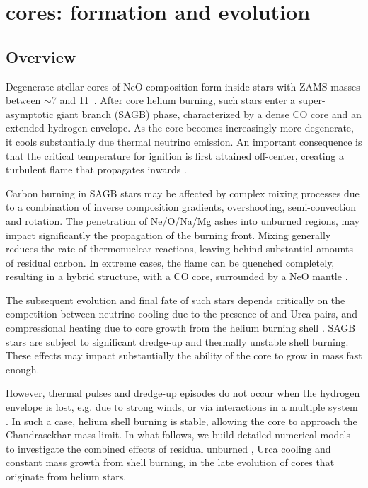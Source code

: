 \documentclass[twocolumn]{aa}
\begin{document}
\section{\one cores: formation and evolution}\label{sec:2}
\subsection{Overview}
Degenerate stellar cores of NeO composition form inside stars with ZAMS masses  
between  $\sim$7 and 11\msun\ \citep[e.g.][]{Poelarends:2007ip,Farmer:2015afs}. 
After core helium burning, such stars enter a super-asymptotic giant branch 
(SAGB) phase, characterized by a dense CO  
core and an  extended hydrogen envelope.  
As the core becomes increasingly more degenerate, it cools substantially 
due thermal neutrino emission. An important consequence is that the critical 
temperature for  ignition is first attained off-center, creating a 
turbulent flame that propagates inwards \citep{siess2006}. 
 

Carbon burning in SAGB stars may be affected by complex mixing processes 
due to a combination of inverse composition gradients, overshooting, 
semi-convection and rotation. The penetration of 
Ne/O/Na/Mg ashes into unburned regions, may impact significantly the propagation of
the burning front. Mixing generally reduces the rate of thermonuclear reactions, leaving 
behind substantial amounts of residual carbon. In extreme cases, the flame can be 
quenched completely, resulting in a hybrid structure,  with a CO core, 
surrounded by a NeO mantle \citep{Denissenkov:2013qaa}. 

The subsequent evolution and final fate of such stars depends  critically on the competition 
between neutrino cooling due to the presence of  and 
 Urca pairs, and compressional heating due to core growth from the helium burning shell \citep{Schwab:2017epw}. 
SAGB stars are subject to significant dredge-up  and 
thermally unstable shell burning. 
These effects may impact substantially the ability of the core to grow in mass fast enough. 

However, thermal pulses and dredge-up episodes do not 
occur when the hydrogen envelope 
is lost, e.g. due to strong winds, or via  interactions   in a multiple system \citep{Woosley:2019sdf}.  
In such a case, helium shell burning is stable, allowing  
the core to approach the Chandrasekhar mass limit. 
In what follows, we build detailed numerical models to 
investigate the combined effects 
of residual unburned , Urca cooling and constant mass growth from shell 
burning, in the late evolution of \one cores that originate from helium stars. 
\end{document}
